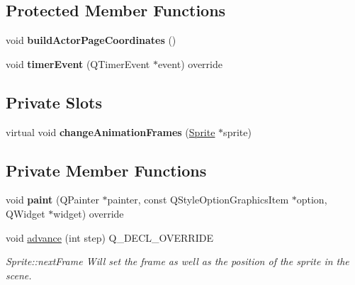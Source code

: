 \subsection*{Protected Member Functions}
\begin{DoxyCompactItemize}
\item 
\mbox{\label{class_actor_a8b92acf4b839678301491ca5ecd7580d}} 
void {\bfseries build\+Actor\+Page\+Coordinates} ()
\item 
\mbox{\label{class_actor_a1aa4b3f2a1db3a5fb65f5a233f00dc52}} 
void {\bfseries timer\+Event} (Q\+Timer\+Event $\ast$event) override
\end{DoxyCompactItemize}
\subsection*{Private Slots}
\begin{DoxyCompactItemize}
\item 
\mbox{\label{class_actor_ab2820addeaf0b6b2949c2421cc228038}} 
virtual void {\bfseries change\+Animation\+Frames} (\hyperlink{class_sprite}{Sprite} $\ast$sprite)
\end{DoxyCompactItemize}
\subsection*{Private Member Functions}
\begin{DoxyCompactItemize}
\item 
\mbox{\label{class_actor_a4265436c1b899cd3d78dab0e0b255579}} 
void {\bfseries paint} (Q\+Painter $\ast$painter, const Q\+Style\+Option\+Graphics\+Item $\ast$option, Q\+Widget $\ast$widget) override
\item 
\mbox{\label{class_actor_a4aa7f044ffb6dfa5f8ebf243243ee462}} 
void \hyperlink{class_actor_a4aa7f044ffb6dfa5f8ebf243243ee462}{advance} (int step) Q\+\_\+\+D\+E\+C\+L\+\_\+\+O\+V\+E\+R\+R\+I\+DE
\begin{DoxyCompactList}\small\item\em Sprite\+::next\+Frame Will set the frame as well as the position of the sprite in the scene. \end{DoxyCompactList}\end{DoxyCompactItemize}
